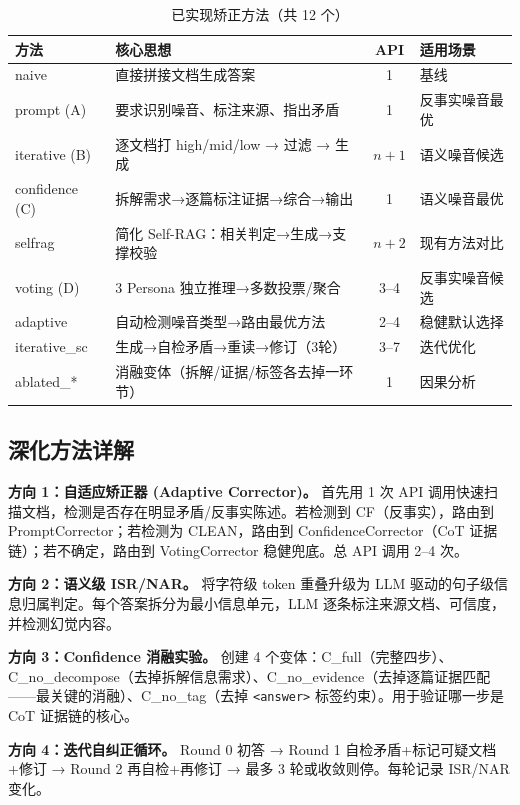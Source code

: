 \documentclass[UTF8,zihao=-4]{ctexart}
\begin{document}
\begin{table}[H]
  \centering
  \caption{已实现矫正方法（共 12 个）}
  \begin{tabularx}{\textwidth}{lYcY}
    \toprule
    方法 & 核心思想 & API & 适用场景 \\
    \midrule
    naive & 直接拼接文档生成答案 & 1 & 基线 \\
    prompt (A) & 要求识别噪音、标注来源、指出矛盾 & 1 & 反事实噪音最优 \\
    iterative (B) & 逐文档打 high/mid/low → 过滤 → 生成 & $n+1$ & 语义噪音候选 \\
    confidence (C) & 拆解需求→逐篇标注证据→综合→输出 & 1 & 语义噪音最优 \\
    selfrag & 简化 Self-RAG：相关判定→生成→支撑校验 & $n+2$ & 现有方法对比 \\
    voting (D) & 3 Persona 独立推理→多数投票/聚合 & 3--4 & 反事实噪音候选 \\
    adaptive & 自动检测噪音类型→路由最优方法 & 2--4 & 稳健默认选择 \\
    iterative\_sc & 生成→自检矛盾→重读→修订（3轮） & 3--7 & 迭代优化 \\
    ablated\_* & 消融变体（拆解/证据/标签各去掉一环节）& 1 & 因果分析 \\
    \bottomrule
  \end{tabularx}
\end{table}

\subsection{深化方法详解}

\textbf{方向 1：自适应矫正器 (Adaptive Corrector)。} 首先用 1 次 API 调用快速扫描文档，检测是否存在明显矛盾/反事实陈述。若检测到 CF（反事实），路由到 PromptCorrector；若检测为 CLEAN，路由到 ConfidenceCorrector（CoT 证据链）；若不确定，路由到 VotingCorrector 稳健兜底。总 API 调用 2--4 次。

\textbf{方向 2：语义级 ISR/NAR。} 将字符级 token 重叠升级为 LLM 驱动的句子级信息归属判定。每个答案拆分为最小信息单元，LLM 逐条标注来源文档、可信度，并检测幻觉内容。

\textbf{方向 3：Confidence 消融实验。} 创建 4 个变体：C\_full（完整四步）、C\_no\_decompose（去掉拆解信息需求）、C\_no\_evidence（去掉逐篇证据匹配——最关键的消融）、C\_no\_tag（去掉 \texttt{<answer>} 标签约束）。用于验证哪一步是 CoT 证据链的核心。

\textbf{方向 4：迭代自纠正循环。} Round 0 初答 → Round 1 自检矛盾+标记可疑文档+修订 → Round 2 再自检+再修订 → 最多 3 轮或收敛则停。每轮记录 ISR/NAR 变化。
\end{document}

